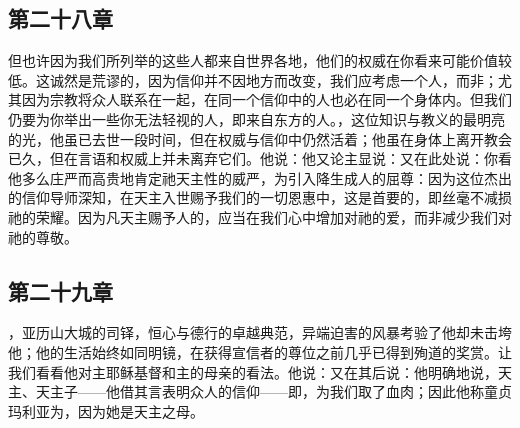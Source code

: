 
\subsection{第二十八章}

\par

但也许因为我们所列举的这些人都来自世界各地，他们的权威在你看来可能价值较低。这诚然是荒谬的，因为信仰并不因地方而改变，我们应考虑一个人，而非；尤其因为宗教将众人联系在一起，在同一个信仰中的人也必在同一个身体内。但我们仍要为你举出一些你无法轻视的人，即来自东方的人。，这位知识与教义的最明亮的光，他虽已去世一段时间，但在权威与信仰中仍然活着；他虽在身体上离开教会已久，但在言语和权威上并未离弃它们。他说：他又论主显说：又在此处说：你看他多么庄严而高贵地肯定祂天主性的威严，为引入降生成人的屈尊：因为这位杰出的信仰导师深知，在天主入世赐予我们的一切恩惠中，这是首要的，即丝毫不减损祂的荣耀。因为凡天主赐予人的，应当在我们心中增加对祂的爱，而非减少我们对祂的尊敬。\par


\subsection{第二十九章}

\par

，亚历山大城的司铎，恒心与德行的卓越典范，异端迫害的风暴考验了他却未击垮他；他的生活始终如同明镜，在获得宣信者的尊位之前几乎已得到殉道的奖赏。让我们看看他对主耶稣基督和主的母亲的看法。他说：又在其后说：他明确地说，天主、天主子——他借其言表明众人的信仰——即，为我们取了血肉；因此他称童贞玛利亚为，因为她是天主之母。\par

